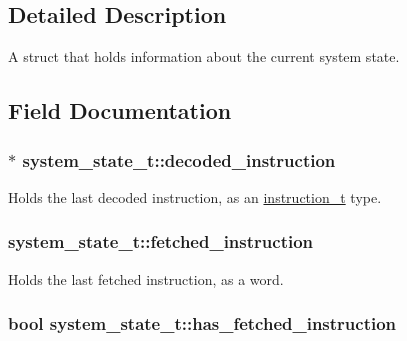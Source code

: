 \subsection{Detailed Description}
A struct that holds information about the current system state. 

\subsection{Field Documentation}
\subsubsection[{\texorpdfstring{decoded\+\_\+instruction}{decoded_instruction}}]{$\ast$ system\+\_\+state\+\_\+t\+::decoded\+\_\+instruction}\hypertarget{structsystem__state__t_ab53a970384d9c812a2a4c6e327b19a95}{}\label{structsystem__state__t_ab53a970384d9c812a2a4c6e327b19a95}


Holds the last decoded instruction, as an \hyperlink{structinstruction__t}{instruction\+\_\+t} type. 

\subsubsection[{\texorpdfstring{fetched\+\_\+instruction}{fetched_instruction}}]{ system\+\_\+state\+\_\+t\+::fetched\+\_\+instruction}\hypertarget{structsystem__state__t_a9cb73fc3980fae6ad4eff34e8461d947}{}\label{structsystem__state__t_a9cb73fc3980fae6ad4eff34e8461d947}


Holds the last fetched instruction, as a word. 

\subsubsection[{\texorpdfstring{has\+\_\+fetched\+\_\+instruction}{has_fetched_instruction}}]{\setlength{\rightskip}{0pt plus 5cm}bool system\+\_\+state\+\_\+t\+::has\+\_\+fetched\+\_\+instruction}\hypertarget{structsystem__state__t_afe188f4e4c4fed3fab882599cfdafa76}{}\label{structsystem__state__t_afe188f4e4c4fed3fab882599cfdafa76}


